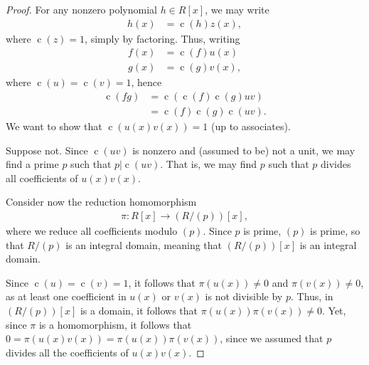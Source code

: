 \documentclass[10pt]{mypackage}
\begin{document}
\begin{proof}
  For any nonzero polynomial $h\in R[x]$, we may write
  \begin{align*}
    h(x) &= \operatorname{c}\left( h \right) z(x),
  \end{align*}
  where $\operatorname{c}\left( z \right) = 1$, simply by factoring. Thus, writing
  \begin{align*}
    f(x) &= \operatorname{c}\left( f \right) u(x)\\
    g(x) &= \operatorname{c}\left( g \right) v(x),
  \end{align*}
  where $\operatorname{c}\left( u \right) = \operatorname{c}\left( v \right) = 1$, hence
  \begin{align*}
    \operatorname{c}\left( fg \right) &= \operatorname{c}\left( \operatorname{c}\left( f \right)\operatorname{c}\left( g \right)u v \right)\\
                                      &= \operatorname{c}\left( f \right)\operatorname{c}\left( g \right)\operatorname{c}\left( uv \right).
  \end{align*}
  We want to show that $\operatorname{c}\left( u(x)v(x) \right) = 1$ (up to associates).%

  Suppose not. Since $ \operatorname{c}\left( uv \right) $ is nonzero and (assumed to be) not a unit, we may find a prime $p$ such that $ p | \operatorname{c}\left( u v \right) $. That is, we may find $p$ such that $p$ divides all coefficients of $u(x)v(x)$.%

  Consider now the reduction homomorphism
  \begin{align*}
    \pi\colon R[x]\rightarrow \left( R/\left( p \right) \right)[x],
  \end{align*}
  where we reduce all coefficients modulo $\left( p \right)$. Since $p$ is prime, $ \left( p \right) $ is prime, so that $R/\left( p \right)$ is an integral domain, meaning that $\left( R/\left( p \right) \right)[x]$ is an integral domain.%

  Since $ \operatorname{c}\left( u \right) = \operatorname{c}\left( v \right) = 1 $, it follows that $\pi\left( u(x) \right) \neq 0$ and $\pi\left( v(x) \right) \neq 0$, as at least one coefficient in $u(x)$ or $v(x)$ is not divisible by $p$. Thus, in $\left( R/\left( p \right) \right)[x]$ is a domain, it follows that $\pi\left( u(x) \right)\pi\left( v(x) \right)\neq 0$. Yet, since $\pi$ is a homomorphism, it follows that $0 = \pi\left( u(x)v(x) \right) = \pi\left( u(x) \right)\pi\left( v(x) \right)$, since we assumed that $p$ divides all the coefficients of $u(x)v(x)$.
\end{proof}
\end{document}
